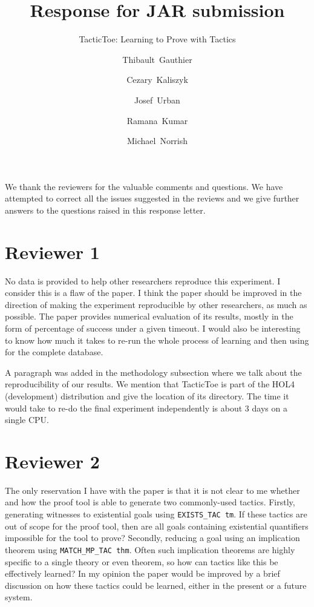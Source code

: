 \documentclass[]{scrartcl}
\title{Response for JAR submission}
\subtitle{TacticToe: Learning to Prove with Tactics}
\author{\mbox{Thibault Gauthier} \and \mbox{Cezary Kaliszyk} \and \mbox{Josef
		Urban} \and \mbox{Ramana Kumar} \and \mbox{Michael Norrish}}
\begin{document}
\maketitle

We thank the reviewers for the valuable comments and questions. We have 
attempted to correct all the issues suggested in the reviews and we give 
further answers to the questions raised in this response letter.

\section*{Reviewer 1}

\begin{leftbar}
No data is provided to help other researchers reproduce this experiment.  I 
consider this is a flaw of the paper.  I think the paper should be improved in 
the direction of making the experiment reproducible by other researchers, as 
much as possible. The paper provides numerical evaluation of its results, 
mostly in the form of 
percentage of success under a given timeout. I would also be interesting to 
know how much it takes to re-run the whole process of learning and then using 
for the complete database.
\end{leftbar}

A paragraph was added in the methodology subsection where we talk about the 
reproducibility of our results. We mention that TacticToe is part of the HOL4 
(development) distribution and give the location of its directory.
The time it would take to re-do the final experiment independently is about 3 
days on a single CPU.

\section*{Reviewer 2}

\begin{leftbar}
The only reservation I have with the paper is that it is not clear to me 
whether and how the proof tool is able to generate two commonly-used tactics. 
Firstly, generating witnesses to existential goals using \texttt{EXISTS\_TAC 
tm}. If these 
tactics are out of scope for the proof tool, then are all goals containing 
existential
quantifiers impossible for the tool to prove? Secondly, reducing a goal using 
an implication theorem using \texttt{MATCH\_MP\_TAC thm}. Often such 
implication theorems 
are
highly specific to a single theory or even theorem, so how can tactics like 
this be effectively learned? In my opinion the paper would be improved by a 
brief
discussion on how these tactics could be learned, either in the present or a 
future system.
\end{leftbar}
\end{document}
